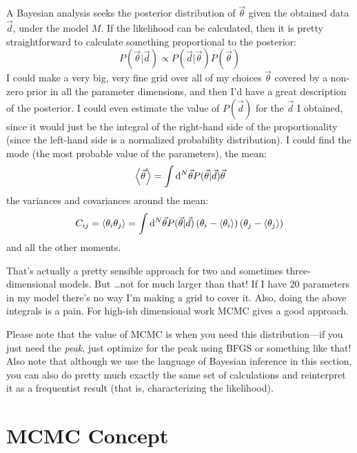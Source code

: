 A Bayesian analysis seeks the posterior distribution of $\vec{\theta}$
given the obtained data $\vec{d}$, under the model $M$. If the
likelihood can be calculated, then it is pretty straightforward to
calculate something proportional to the posterior:
\begin{equation}
P(\vec{\theta} | \vec{d} ) \propto P(\vec{d} | \vec{\theta} )
P(\vec{\theta})
\end{equation}
I could make a very big, very fine grid over all of my choices
$\vec{\theta}$ covered by a non-zero prior in all the parameter
dimensions, and then I'd have a great description of the posterior. I
could even estimate the value of $P(\vec{d})$ for the $\vec{d}$ I
obtained, since it would just be the integral of the right-hand side
of the proportionality (since the left-hand side is a normalized
probability distribution). I could find the mode (the most probable
value of the parameters), the mean:
\begin{equation}
\left\langle \vec{\theta} \right\rangle = \int {\rm d}^N\vec{\theta}
P(\vec{\theta}|\vec{d}) \vec{\theta}
\end{equation}
the variances and covariances around the mean:
\begin{equation}
C_{ij} = \left\langle {\theta_i} {\theta_j} \right\rangle = \int {\rm d}^N\vec{\theta}
P(\vec{\theta}|\vec{d})
\left(\theta_i - \langle\theta_i\rangle\right)
\left(\theta_j - \langle\theta_j\rangle\right)
\end{equation}
and all the other moments.

That's actually a pretty sensible approach for two and sometimes
three-dimensional models. But \ldots not for much larger than that! If
I have 20 parameters in my model there's no way I'm making a grid to
cover it. Also, doing the above integrals is a pain. For high-ish
dimensional work MCMC gives a good approach.

Please note that the value of MCMC is when you need this
distribution---if you just need the {\it peak}, just optimize for the
peak using BFGS or something like that! Also note that although we use
the language of Bayesian inference in this section, you can also do
pretty much exactly the same set of calculations and reinterpret it as
a frequentist result (that is, characterizing the likelihood).

\section{MCMC Concept}

